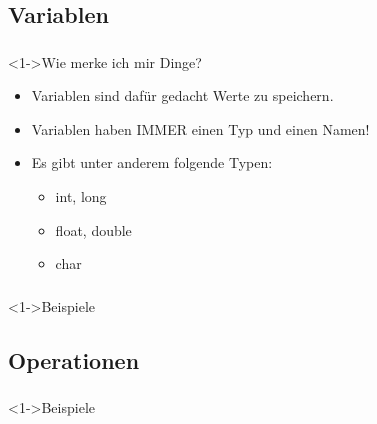 \subsection{Variablen}
\begin{frame}
	\frametitle{\currentsection}
	\framesubtitle{\currentsubsection}
	\begin{block}<1->{Wie merke ich mir Dinge?}
		\begin{itemize}
			\item Variablen sind dafür gedacht Werte zu speichern.
			\item Variablen haben IMMER einen Typ und einen Namen!
			\item Es gibt unter anderem folgende Typen:
			\begin{itemize}
				\item int, long
				\item float, double
				\item char
			\end{itemize}
		\end{itemize}
	\end{block}
\end{frame}
\begin{frame}
	\frametitle{\currentsection}
	\framesubtitle{\currentsubsection}
	\begin{block}<1->{Beispiele}
		
	\end{block}
\end{frame}

\subsection{Operationen}
\begin{frame}
	\frametitle{\currentsection}
	\framesubtitle{\currentsubsection}
	\begin{block}<1->{Beispiele}
		
	\end{block}
\end{frame}


